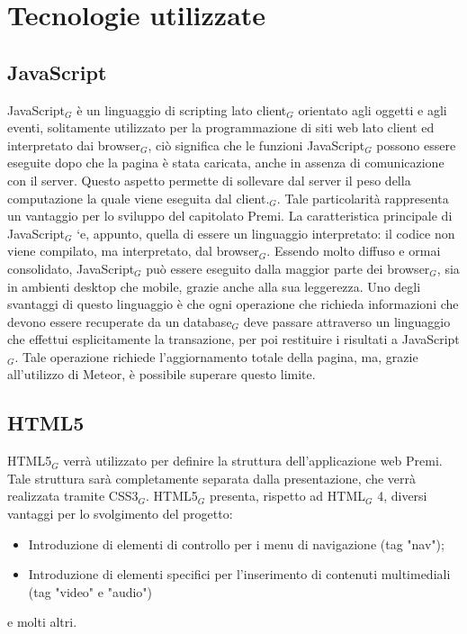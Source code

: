 \section{Tecnologie utilizzate}

\subsection{JavaScript}

JavaScript$_G$ è un linguaggio di scripting lato client$_G$ orientato agli oggetti e agli eventi, solitamente utilizzato per la programmazione di siti web lato client ed interpretato dai browser$_G$, ciò significa che le funzioni JavaScript$_G$ possono essere eseguite dopo che la pagina è stata caricata, anche in assenza di comunicazione con il server. Questo aspetto permette di sollevare dal server il peso della computazione la quale viene eseguita dal client.$_G$. Tale particolarità rappresenta un vantaggio per lo sviluppo del capitolato Premi. La caratteristica principale di JavaScript$_G$ `e, appunto, quella di essere un linguaggio interpretato: il codice non viene compilato, ma interpretato, dal browser$_G$. Essendo molto diffuso e ormai consolidato, JavaScript$_G$ può essere eseguito dalla maggior parte dei browser$_G$, sia in ambienti desktop che mobile, grazie anche alla sua leggerezza. Uno degli svantaggi di questo linguaggio è che ogni operazione che richieda informazioni che devono essere recuperate da un database$_G$ deve passare attraverso un linguaggio che effettui esplicitamente la transazione, per poi restituire i risultati a JavaScript$_G$. Tale operazione richiede l'aggiornamento totale della pagina, ma, grazie all'utilizzo di Meteor, è possibile superare questo limite.

\subsection{HTML5}

HTML5$_G$ verrà utilizzato per definire la struttura dell'applicazione web Premi. Tale struttura sarà completamente separata dalla presentazione, che verrà realizzata tramite CSS3$_G$. HTML5$_G$ presenta, rispetto ad HTML$_G$ 4, diversi vantaggi per lo svolgimento del progetto:
\begin{itemize}
\item Introduzione di elementi di controllo per i menu di navigazione (tag "nav");
\item Introduzione di elementi specifici per l'inserimento di contenuti multimediali (tag "video" e "audio")
\end{itemize}
e molti altri.

